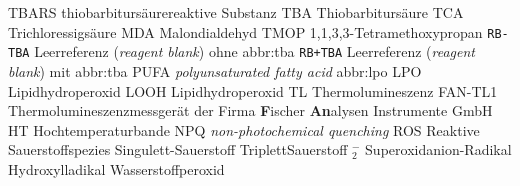                 {TBARS}
                {thiobarbitursäurereaktive Substanz}
                {TBA}
                {Thiobarbitursäure}
                {TCA}
                {Trichloressigsäure}
                {MDA}
                {Malondialdehyd}
                {TMOP}
                {1,1,3,3-Tetramethoxypropan}
                {\texttt{RB-TBA}}
                {Leerreferenz (\textit{reagent blank}) ohne \gls{abbr:tba}}
                {\texttt{RB+TBA}}
                {Leerreferenz (\textit{reagent blank}) mit \gls{abbr:tba}}
                {PUFA}
                {\textit{polyunsaturated fatty acid}}
\newabbreviation %
                {abbr:lpo}
                {LPO}
                {Lipidhydroperoxid}
                {LOOH}
                {Lipidhydroperoxid}
                {TL}
                {Thermolumineszenz}
                {FAN-TL1}
                {Thermolumineszenzmessgerät der Firma \textbf{F}ischer \textbf{An}alysen Instrumente GmbH}
                {HT}
                {Hochtemperaturbande}
                {NPQ}
                {\textit{non-photochemical quenching}}
                {ROS}
                {Reaktive Sauerstoffspezies}
                {}
                {Singulett-Sauerstoff}
                {}
                {TriplettSauerstoff}
                {$^-_2$}
                {Superoxidanion-Radikal}
                {}
                {Hydroxylladikal}
                {}
                {Wasserstoffperoxid}
\newabbreviation[sort={PS1}]
